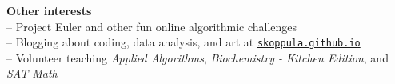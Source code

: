 \documentclass[letterpaper,11pt]{article}
\begin{document}
\vspace{0.1in}
\large \textbf{Other interests\vspace{1mm}} \normalsize \\
\hspace{2mm} -- Project Euler and other fun online algorithmic challenges \\
\hspace{2mm} -- Blogging about coding, data analysis, and art at \href{http://www.skoppula.github.io}{\nolinkurl{skoppula.github.io}}\\
\hspace{2mm} -- Volunteer teaching \textit{Applied Algorithms}, \textit{Biochemistry - Kitchen Edition}, and \textit{SAT Math} \\ 
\end{document}
